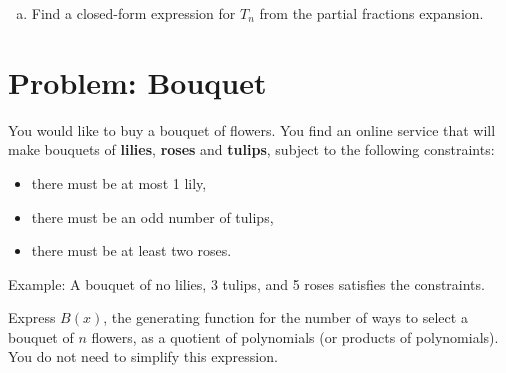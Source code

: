 \documentclass[12pt]{article}
\begin{document}
\begin{enumerate}[(a)]
\item Find a closed-form expression for $T_n$ from the partial
fractions expansion.


\end{enumerate}

\newpage
\section{Problem: Bouquet}


You would like to buy a bouquet of flowers.  You find an
online service that will make bouquets of \textbf{lilies}, \textbf{roses}
and \textbf{tulips}, subject to the following constraints:
\begin{itemize}
\item there must be at most 1 lily,
\item there must be an odd number of tulips,
\item there must be at least two roses.
\end{itemize}

Example: A bouquet of no lilies, 3 tulips, and 5 roses satisfies the
constraints.

Express $B(x)$, the generating function for the number of ways
to select a bouquet of $n$ flowers, as a quotient of polynomials (or
products of polynomials).  You do not need to simplify this
expression.


\end{document}
